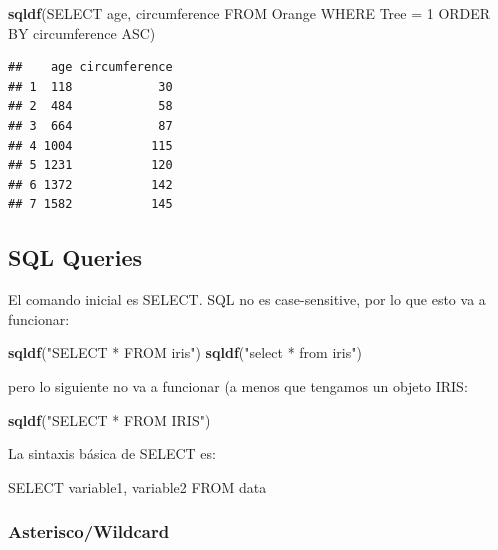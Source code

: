 \documentclass[
]{book}
\newenvironment{Shaded}{\begin{snugshade}}{\end{snugshade}}
\newcommand{\FunctionTok}[1]{\textcolor[rgb]{0.13,0.29,0.53}{\textbf{#1}}}
\newcommand{\NormalTok}[1]{#1}
\newcommand{\StringTok}[1]{\textcolor[rgb]{0.31,0.60,0.02}{#1}}
\begin{document}
\begin{Shaded}
\begin{Highlighting}[]
\FunctionTok{sqldf}\NormalTok{(}\StringTok{\textquotesingle{}SELECT age, circumference FROM Orange WHERE Tree = 1 ORDER BY circumference ASC\textquotesingle{}}\NormalTok{)}
\end{Highlighting}
\end{Shaded}

\begin{verbatim}
##    age circumference
## 1  118            30
## 2  484            58
## 3  664            87
## 4 1004           115
## 5 1231           120
## 6 1372           142
## 7 1582           145
\end{verbatim}

\hypertarget{sql-queries}{%
\subsection{SQL Queries}\label{sql-queries}}

El comando inicial es SELECT. SQL no es case-sensitive, por lo que esto va a funcionar:

\begin{Shaded}
\begin{Highlighting}[]
\FunctionTok{sqldf}\NormalTok{(}\StringTok{"SELECT * FROM iris"}\NormalTok{)}
\FunctionTok{sqldf}\NormalTok{(}\StringTok{"select * from iris"}\NormalTok{)}
\end{Highlighting}
\end{Shaded}

pero lo siguiente no va a funcionar (a menos que tengamos un objeto IRIS:

\begin{Shaded}
\begin{Highlighting}[]
\FunctionTok{sqldf}\NormalTok{(}\StringTok{"SELECT * FROM IRIS"}\NormalTok{)}
\end{Highlighting}
\end{Shaded}

La sintaxis básica de SELECT es:

\begin{Shaded}
\begin{Highlighting}[]
\NormalTok{SELECT variable1, variable2 FROM data}
\end{Highlighting}
\end{Shaded}

\hypertarget{asteriscowildcard}{%
\subsubsection{Asterisco/Wildcard}\label{asteriscowildcard}}
\end{document}
